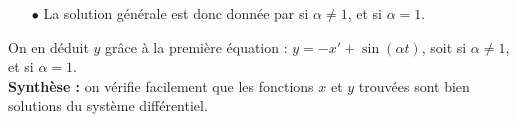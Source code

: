 \documentclass[a4paper, 11pt,reqno]{article}
\begin{document}
\begin{correction}
\begin{itemize}
\begin{itemize}
puis 
$$x''_p(t) = D \cos t - (C+ Dt) \sin t - C \sin t + (D-C t) \cos t = (2D - C t) \cos t - (2 C + D t) \sin t.$$
En rempla\c cant dans l'\'equation, on obtient 
$$\begin{array}{lrcl}
& (2D - C t) \cos t - (2 C + D t) \sin t + Ct \cos t + D t \sin t & = & 2 \cos t\vsec\\
\Rightarrow & 2D \cos t - 2 C \sin t & = & 2 \cos t.
\end{array}$$
En prenant $t=0$, on obtient $2D = 2$, soit $D=1$. Puis en prenant $t=\ddp \frac{\pi}{2}$, on a $-2C = 0$, soit $C=0$. Donc finalement, $x_p(t) = t \sin t$.
\end{itemize}
\item[$\bullet$] La solution g\'en\'erale est donc donn\'ee par  si $\alpha \not=1$, et  si $\alpha = 1$.
\end{itemize}
On en d\'eduit $y$ gr\^ace \`a la premi\`ere \'equation : $y = -x'+\sin(\alpha t)$, soit  si $\alpha \not=1$, et  si $\alpha = 1$.\\
\textbf{Synth\`ese :} on v\'erifie facilement que les fonctions $x$ et $y$ trouv\'ees sont bien solutions du syst\`eme diff\'erentiel.
\end{correction}



\end{document}
